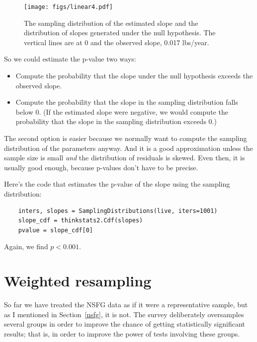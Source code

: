 \documentclass[12pt]{book}
\theoremstyle{exercise}
\begin{document}
\begin{figure}
\centerline{\texttt{[image: figs/linear4.pdf]}}
\caption{The sampling distribution of the estimated
slope and the distribution of slopes
generated under the null hypothesis.  The vertical lines are at 0
and the observed slope, 0.017 lbs/year.}%
\label{linear4}
\end{figure}

So we could estimate the p-value two ways:%

\begin{itemize}

\item Compute the probability that the slope under the null
hypothesis exceeds the observed slope.%

\item Compute the probability that the slope in the sampling
distribution falls below 0.  (If the estimated slope were negative,
we would compute the probability that the slope in the sampling
distribution exceeds 0.)

\end{itemize}

The second option is easier because we normally want to compute the
sampling distribution of the parameters anyway.  And it is a good
approximation unless the sample size is small {\em and\/} the
distribution of residuals is skewed.  Even then, it is usually good
enough, because p-values don't have to be precise.%
%

Here's the code that estimates the p-value of the slope using the
sampling distribution:%

\begin{verbatim}
    inters, slopes = SamplingDistributions(live, iters=1001)
    slope_cdf = thinkstats2.Cdf(slopes)
    pvalue = slope_cdf[0]
\end{verbatim}

Again, we find $p < 0.001$.  


\section{Weighted resampling}%
\label{weighted}

So far we have treated the NSFG data as if it were a representative
sample, but as I mentioned in Section~\ref{nsfg}, it is not.  The
survey deliberately oversamples several groups in order to
improve the chance of getting statistically significant results; that
is, in order to improve the power of tests involving these groups.%
%
\end{document}
